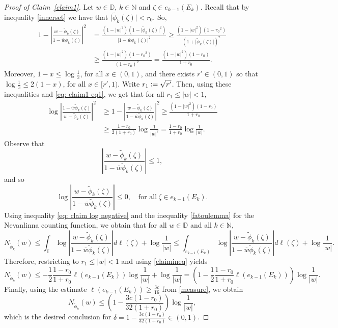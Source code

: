 \documentclass[10pt,a4paper]{amsart}
\newcommand{\D}{\mathbb{D}}
\newcommand{\N}{\mathbb{N}}
\newcommand{\T}{\mathbb{T}}
\renewcommand{\geq}{\geqslant}
\renewcommand{\leq}{\leqslant}
\begin{document}
\begin{proof}[Proof of Claim~\ref{claim1}]
Let $w\in\D$, $k\in\N$ and $\zeta\in e_{k-1}(E_k)$. Recall that by inequality \eqref{innerset} we have that $\lvert\widetilde{\phi}_k(\zeta)\rvert <r_0$. So,
\begin{align}
1-\left\lvert \frac{w-\widetilde{\phi}_k(\zeta)}{1-\overline{w}\widetilde{\phi}_k(\zeta)} \right\rvert^2&=\frac{(1-\lvert w \rvert^2)(1-\lvert \widetilde{\phi}_k(\zeta) \rvert^2)}{\lvert 1- \overline{w}\widetilde{\phi}_k(\zeta)\rvert^2}\geq \frac{(1-\lvert w \rvert^2)(1-{r_0}^2)}{(1+\lvert\widetilde{\phi}_k(\zeta)\rvert)^2}\nonumber\\
	&\geq \frac{(1-\lvert w \rvert^2)(1-{r_0}^2)}{(1+r_0)^2}=\frac{(1-\lvert w \rvert^2)(1-{r_0})}{1+r_0}. \label{eq: claim1 eq1}
\end{align}
Moreover, $1-x\leq \log\frac{1}{x}$, for all $x\in(0,1)$, and there exists $r'\in(0,1)$ so that $\log\frac{1}{x}\leq 2(1-x)$, for all $x\in[r',1)$. Write $r_1\vcentcolon=\sqrt{r'}$. Then, using these inequalities and \eqref{eq: claim1 eq1}, we get that for all $r_1\leq\lvert w \rvert <1$,
\begin{align}
\log \left\lvert \frac{1-\overline{w}\widetilde{\phi}_k(\zeta)}{w-\widetilde{\phi}_k(\zeta)} \right\rvert^2&\geq 1-\left\lvert \frac{w-\widetilde{\phi}_k(\zeta)}{1-\overline{w}\widetilde{\phi}_k(\zeta)} \right\rvert^2\geq \frac{(1-\lvert w \rvert^2)(1-{r_0})}{1+r_0}\nonumber\\
	&\geq \frac{1-{r_0}}{2(1+r_0)}\log\frac{1}{\lvert w \rvert^2}=\frac{1-{r_0}}{1+r_0}\log\frac{1}{\lvert w \rvert}\label{claimineq}.
\end{align}
Observe that 
\[
\left\lvert \frac{w-\widetilde{\phi}_k(\zeta)}{1-\overline{w}\widetilde{\phi}_k(\zeta)} \right\rvert\leq 1,
\]
and so
\begin{equation}\label{eq: claim log negative}
\log\left\lvert \frac{w-\widetilde{\phi}_k(\zeta)}{1-\overline{w}\widetilde{\phi}_k(\zeta)} \right\rvert\leq 0, \quad\text{for all}\ \zeta\in e_{k-1}(E_k).
\end{equation}
Using inequality \eqref{eq: claim log negative} and the inequality \eqref{fatoulemma} for the Nevanlinna counting function, we obtain that for all $w\in\D$ and all $k\in\N$,
\[
N_{\widetilde{\phi}_k}(w)\leq \int_{\T}\log\left\lvert \frac{w-\widetilde{\phi}_k(\zeta)}{1-\overline{w}\widetilde{\phi}_k(\zeta)} \right\rvert d\ell(\zeta)+\log\frac{1}{\lvert w \rvert}\leq \int_{e_{k-1}(E_k)} \log\left\lvert \frac{w-\widetilde{\phi}_k(\zeta)}{1-\overline{w}\widetilde{\phi}_k(\zeta)} \right\rvert d\ell(\zeta)+\log\frac{1}{\lvert w \rvert}.
\]
Therefore, restricting to $r_1\leq \lvert w\rvert <1$ and using \eqref{claimineq} yields
\[
N_{\widetilde{\phi}_k}(w)\leq -\frac{1}{2}\frac{1-{r_0}}{1+r_0}\ell(e_{k-1}(E_k))\log\frac{1}{\lvert w \rvert} + \log\frac{1}{\lvert w \rvert} = \left(1-\frac{1}{2}\frac{1-{r_0}}{1+r_0}\ell(e_{k-1}(E_k))\right) \log\frac{1}{\lvert w \rvert}.
\]
Finally, using the estimate $\ell(e_{k-1}(E_k))\geq \frac{3c}{16}$ from \eqref{measure}, we obtain
\[
N_{\widetilde{\phi}_k}(w)\leq \left(1-\frac{3c(1-{r_0})}{32(1+r_0)}\right)\log\frac{1}{\lvert w \rvert},
\]
which is the desired conclusion for $\delta = 1-\frac{3c(1-{r_0})}{32(1+r_0)}\in (0,1)$.
\end{proof}
\end{document}
